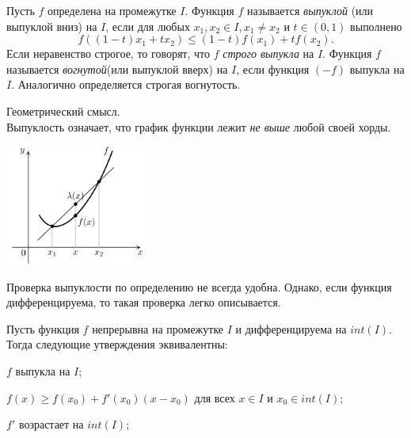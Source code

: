     \begin{definition}
        Пусть $f$ определена на промежутке $I$. Функция $f$ называется \textit{выпуклой} (или выпуклой вниз) на $I$, если для любых $x_{1}, x_{2} \in I, x_{1} \neq x_{2}$ и $t \in (0,1)$ выполнено
        \[f((1-t)x_{1} + tx_{2}) \leq (1-t)f(x_{1}) + tf(x_{2}).\]
        Если неравенство строгое, то говорят, что $f$ \textit{строго выпукла} на $I$. Функция $f$ называется \textit{вогнутой}(или выпуклой вверх) на $I$, если функция $(-f)$ выпукла на $I$. Аналогично определяется строгая вогнутость.
    \end{definition}
    
    \begin{note}
        Геометрический смысл.\\
        Выпуклость означает, что график функции лежит \textit{не выше} любой своей хорды.
        \begin{center}
            \includegraphics[width=0.35\textwidth]{ex2.png}
        \end{center}
    \end{note}
    
    Проверка выпуклости по определению не всегда удобна. Однако, если функция дифференцируема, то такая проверка легко описывается.
    
    \begin{theorem}
        Пусть функция $f$ непрерывна на промежутке $I$ и дифференцируема на $int(I)$. Тогда следующие утверждения эквивалентны:
        \begin{enumerate}
            \item $f$ выпукла на $I$;
            \hypertarget{sec_punkt}{\item} $f(x) \geq f(x_{0}) + f'(x_{0})(x-x_{0})$ для всех $x \in I$ и $x_{0} \in int(I)$;
            \item $f'$ возрастает на $int(I)$;
        \end{enumerate}
    \end{theorem}
    
